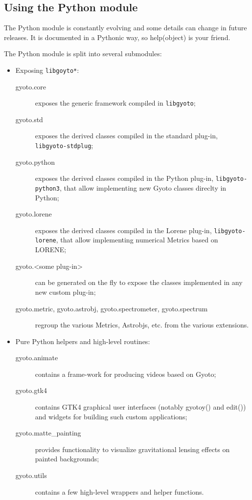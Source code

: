 \documentclass[a4paper,12pt]{article}
\begin{document}
\subsection{Using the Python module}
\label{sect:python}

The Python module is constantly evolving and some details can change
in future releases. It is documented in a Pythonic way, so
help(object) is your friend.

The Python module is split into several submodules:
\begin{itemize}
\item Exposing \texttt{libgoyto*}:
  \begin{description}
  \item[gyoto.core] exposes the generic framework compiled in
    \texttt{libgyoto};
  \item[gyoto.std] exposes the derived classes compiled in the
    standard plug-in, \texttt{libgyoto-stdplug};
  \item[gyoto.python] exposes the derived classes compiled in the
    Python plug-in, \texttt{libgyoto-python3}, that allow implementing
    new Gyoto classes direclty in Python;
  \item[gyoto.lorene] exposes the derived classes compiled in the
    Lorene plug-in, \texttt{libgyoto-lorene}, that allow implementing
    numerical Metrics based on LORENE;
  \item[gyoto.<some plug-in>] can be generated on the fly to expose
    the classes implemented in any new custom plug-in;
  \item[gyoto.metric, gyoto.astrobj, gyoto.spectrometer,
    gyoto.spectrum] regroup the various Metrics, Astrobjs, etc. from
    the various extensions.
  \end{description}
\item Pure Python helpers and high-level routines:
  \begin{description}
  \item[gyoto.animate] contains a frame-work for producing videos based
    on Gyoto;
  \item[gyoto.gtk4] contains GTK4 graphical user interfaces (notably
    gyotoy() and edit()) and widgets for building such custom
    applications;
  \item[gyoto.matte\_painting] provides functionality to visualize
    gravitational lensing effects on painted backgrounds;
  \item[gyoto.utils] contains a few high-level wrappers and helper
    functions.
  \end{description}
\end{itemize}
\end{document}
